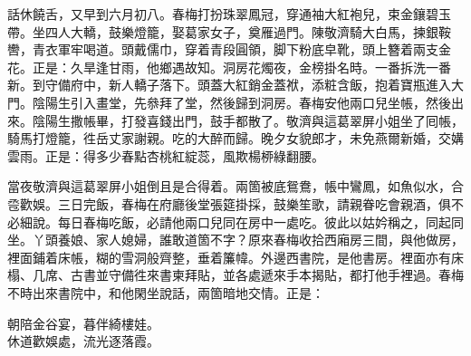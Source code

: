 話休饒舌，又早到六月初八。春梅打扮珠翠鳳冠，穿通袖大紅袍兒，束金鑲碧玉帶。坐四人大轎，鼓樂燈籠，娶葛家女子，奠雁過門。陳敬濟騎大白馬，揀銀鞍轡，青衣軍牢喝道。頭戴儒巾，穿着青段圓領，脚下粉底皁靴，頭上簪着兩支金花。正是：久旱逢甘雨，他鄉遇故知。洞房花燭夜，金榜掛名時。一番拆洗一番新。到守備府中，新人轎子落下。頭蓋大紅銷金蓋袱，添粧含飯，抱着寶瓶進入大門。陰陽生引入畫堂，先叅拜了堂，然後歸到洞房。{}春梅安他兩口兒坐帳，然後出來。陰陽生撒帳畢，打發喜錢出門，鼓手都散了。敬濟與這葛翠屏小姐坐了囘帳，騎馬打燈籠，徃岳丈家謝親。吃的大醉而歸。晚夕女貌郎才，未免燕爾新婚，交媾雲雨。正是：得多少春點杏桃紅綻蕊，風欺楊桺綠翻腰。

當夜敬濟與這葛翠屏小姐倒且是合得着。兩箇被底鴛鴦，帳中鸞鳳，如魚似水，合卺歡娛。三日完飯，春梅在府廳後堂張筵掛採，鼓樂笙歌，請親眷吃會親酒，俱不必細說。每日春梅吃飯，必請他兩口兒同在房中一處吃。彼此以姑妗稱之，同起同坐。丫頭養娘、家人媳婦，誰敢道箇不字？原來春梅收拾西廂房三間，與他做房，裡面鋪着床帳，糊的雪洞般齊整，垂着簾幃。外邊西書院，是他書房。裡面亦有床榻、几席、古書並守備徃來書柬拜貼，並各處遞來手本揭貼，都打他手裡過。春梅不時出來書院中，和他閑坐說話，兩箇暗地交情。正是：

\begin{myquote}
朝陪金谷宴，暮伴綺樓娃。\\休道歡娛處，流光逐落霞。
\end{myquote}

